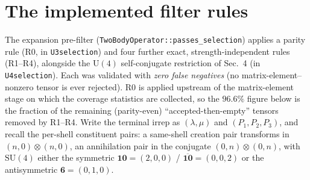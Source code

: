 \documentclass[11pt]{article}
\newcommand{\lm}{\ensuremath{\lambda}}
\newcommand{\mumu}{\ensuremath{\mu}}
\begin{document}
\section{The implemented filter rules}
The expansion pre-filter (\texttt{TwoBodyOperator::passes\_selection}) applies a
parity rule (R0, in \texttt{U3selection}) and four further exact,
strength-independent rules (R1--R4), alongside the $\mathrm{U}(4)$
self-conjugate restriction of Sec.~4 (in \texttt{U4selection}). Each was
validated with \emph{zero false negatives} (no matrix-element--nonzero tensor is
ever rejected). R0 is applied upstream of the matrix-element stage on which the
coverage statistics are collected, so the $96.6\%$ figure below is the fraction
of the remaining (parity-even) ``accepted-then-empty'' tensors removed by
R1--R4. Write the terminal irrep as $(\lm,\mumu)$ and $(P_1,P_2,P_3)$, and
recall the per-shell constituent pairs: a same-shell creation pair transforms in
$(n,0)\otimes(n,0)$, an annihilation pair in the conjugate $(0,n)\otimes(0,n)$,
with $\mathrm{SU}(4)$ either the symmetric $\mathbf{10}=(2,0,0)$ /
$\overline{\mathbf{10}}=(0,0,2)$ or the antisymmetric $\mathbf 6=(0,1,0)$.
\end{document}
